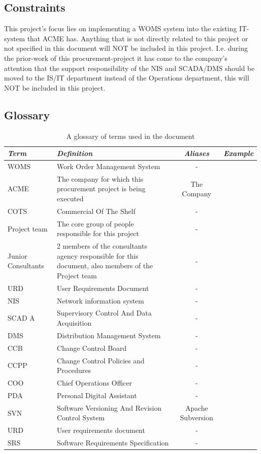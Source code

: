\documentclass[a4paper]{article}
\begin{document}
\subsection{Constraints}
\label{sub:constraints}

This project's focus lies on implementing a WOMS system into the existing IT-system that ACME has. Anything that is not directly related to this project or not specified in this document will NOT be included in this project.  I.e. during the prior-work of this procurement-project it has come to the company's attention that the support responsibility of the NIS and SCADA/DMS should be moved to the IS/IT department instead of the Operations department, this will NOT be included in this project. 

\subsection{Glossary}
\label{sub:glossary}

\begin{table}[H]
	\centering
	\begin{tabular}{|p{2cm}| p{3cm} |c| p{3cm} |}
	\hline
		\textit{Term} & \textit{Definition} & \textit{Aliases} & \textit{Example} \\
	\hline 
		
		WOMS	 & Work Order Management System & - & \\ \hline	
		ACME	 & The company for which this procurement project is being executed& The Company & \\	\hline
		COTS	 & Commercial Of The Shelf & - & \\ \hline
		Project team & The core group of people responsible for this project & - & \\ \hline
		Junior Consultants & 2 members of the consultants agency responsible for this document, also members of the Project team & - & \\ \hline
		URD & User Requirements Document & - & \\ \hline
		NIS	& Network information system & - & \\	\hline	
		SCAD	A & Supervisory Control And Data Acquisition & - & \\  \hline
		DMS & Distribution Management System & - & \\ \hline
		CCB	& Change Control Board & - & \\ \hline
		CCPP	 & Change Control Policies and Procedures & - & \\ \hline
		COO	& Chief Operations Officer & - & \\ \hline
		PDA	& Personal Digital Assistant & - & \\ \hline
		SVN & Software Versioning And Revision Control System & Apache Subversion & \\ 
		URD & User requirements document & - &\\
		SRS & Software Requirements Specification & - & \\  

	\hline
	
	\end{tabular}
	\caption{A glossary of terms used in the document}
\end{table}
\end{document}
